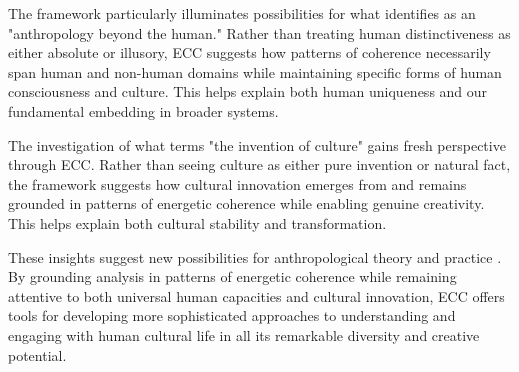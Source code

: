 The framework particularly illuminates possibilities for what \cite{kohn2013forests} identifies as an "anthropology beyond the human." Rather than treating human distinctiveness as either absolute or illusory, ECC suggests how patterns of coherence necessarily span human and non-human domains while maintaining specific forms of human consciousness and culture. This helps explain both human uniqueness and our fundamental embedding in broader systems.

The investigation of what \cite{wagner2016invention} terms "the invention of culture" gains fresh perspective through ECC. Rather than seeing culture as either pure invention or natural fact, the framework suggests how cultural innovation emerges from and remains grounded in patterns of energetic coherence while enabling genuine creativity. This helps explain both cultural stability and transformation.

These insights suggest new possibilities for anthropological theory and practice \cite{rabinow2008marking}. By grounding analysis in patterns of energetic coherence while remaining attentive to both universal human capacities and cultural innovation, ECC offers tools for developing more sophisticated approaches to understanding and engaging with human cultural life in all its remarkable diversity and creative potential.
